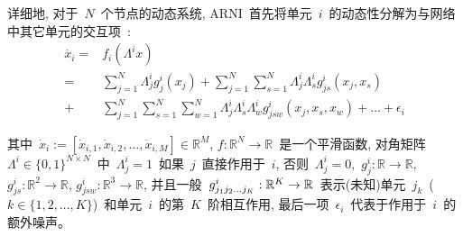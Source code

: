 详细地, 对于~$N$~个节点的动态系统, 
ARNI~首先将单元~$i$~的动态性分解为与网络中其它单元的交互项~\cite{casadiego2017model}:
\begin{equation}
\label{eq:xi}
\begin{split}
\dot{x_i}= & f_i(\Lambda ^i x)\\
         = &\sum_{j=1}^{N} \Lambda^i_{j} g^i_j(x_j) + 
                             \sum_{j=1}^{N} \sum_{s=1}^{N}\Lambda^i_{j}\Lambda^i_{s}g^i_{js}(x_j,x_s)\\
         + &\sum_{j=1}^{N} \sum_{s=1}^{N} \sum_{w=1}^{N}\Lambda^i_{j}\Lambda^i_{s}\Lambda^i_{w}g^i_{jsw}(x_j,x_s,x_w)+ \ldots + \epsilon_{i}
\end{split}
\end{equation}

其中~$\dot{x}_i :=[\dot{x}_{i,1}, \dot{x}_{i,2},\ldots,\dot{x}_{i,M}]\in \mathbb{R}^M$,
$f:\mathbb{R}^N \to \mathbb{R}$~是一个平滑函数, 
对角矩阵~$\Lambda^i \in \{0,1\}^{N \times N}$~中~$\Lambda^i_{j}=1$~如果~$j$~直接作用于~$i$, 
否则~$\Lambda^i_{j}=0$,~$g^i_j:\mathbb{R} \to \mathbb{R}$, $g^i_{js}:\mathbb{R}^2 \to \mathbb{R}$, $g^i_{jsw}:\mathbb{R}^3 \to \mathbb{R}$,
并且一般~$g^i_{j_{1}j_{2}\ldots\\j_{K}}:\mathbb{R}^K \to \mathbb{R}$~表示(未知)单元~$j_k$~($k \in \{1,2,\ldots,K\}$)~和单元~$i$~的第~$K$~阶相互作用, 
最后一项~$\epsilon_{i}$~代表于作用于~$i$~的额外噪声。

